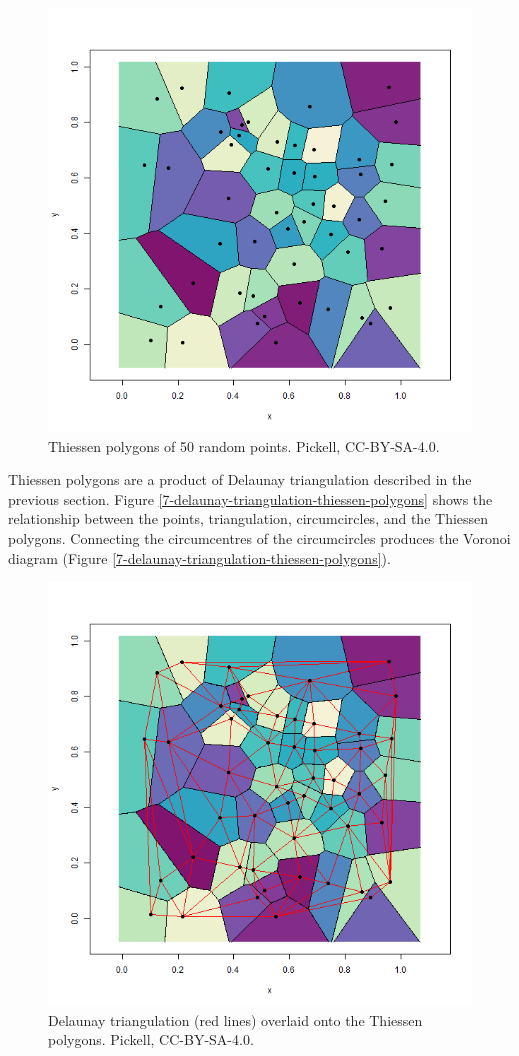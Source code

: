 \documentclass[
]{book}
\begin{document}
\begin{figure}
\includegraphics[width=0.75\linewidth]{images/07-2d-thiessen-polygons} \caption{Thiessen polygons of 50 random points. Pickell, CC-BY-SA-4.0.}\label{fig:7-2d-thiessen-polygons}
\end{figure}

Thiessen polygons are a product of Delaunay triangulation described in the previous section. Figure \ref{7-delaunay-triangulation-thiessen-polygons} shows the relationship between the points, triangulation, circumcircles, and the Thiessen polygons. Connecting the circumcentres of the circumcircles produces the Voronoi diagram (Figure \ref{7-delaunay-triangulation-thiessen-polygons}).

\begin{figure}
\includegraphics[width=0.75\linewidth]{images/07-delaunay-triangulation-thiessen-polygons} \caption{Delaunay triangulation (red lines) overlaid onto the Thiessen polygons. Pickell, CC-BY-SA-4.0.}\label{fig:7-delaunay-triangulation-thiessen-polygons}
\end{figure}
\end{document}
